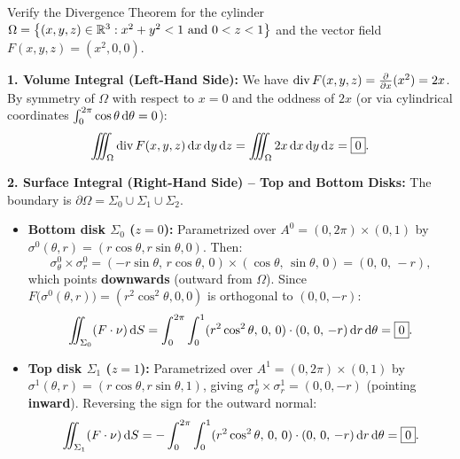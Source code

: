 \begin{exemple}
Verify the Divergence Theorem for the cylinder $\Omega = \left\{(x,y,z) \in \mathbb{R}^3 : x^2 + y^2 < 1 \text{ and } 0 < z < 1\right\}$ and the vector field $F(x,y,z) = (x^2, 0, 0)$.

\smallskip
\noindent\textbf{1. Volume Integral (Left-Hand Side):} We have $\operatorname{div} F(x,y,z) = \pdv{}{x}(x^2) = 2x$. By symmetry of $\Omega$ with respect to $x = 0$ and the oddness of $2x$ (or via cylindrical coordinates $\int_0^{2\pi} \cos\theta \,\mathrm{d}\theta = 0$):
\[
    \iiint_{\Omega} \operatorname{div} F(x,y,z) \,\mathrm{d}x\,\mathrm{d}y\,\mathrm{d}z = \iiint_{\Omega} 2x \,\mathrm{d}x\,\mathrm{d}y\,\mathrm{d}z = \boxed{0}.
\]

\noindent\textbf{2. Surface Integral (Right-Hand Side) -- Top and Bottom Disks:} The boundary is $\partial\Omega = \Sigma_0 \cup \Sigma_1 \cup \Sigma_2$.
\begin{itemize}
    \item \textbf{Bottom disk $\Sigma_0$ ($z = 0$):} Parametrized over $A^0 = (0, 2\pi) \times (0, 1)$ by $\sigma^0(\theta, r) = (r \cos\theta, r \sin\theta, 0)$. Then:
    \[
        \sigma^0_\theta \times \sigma^0_r = (-r \sin\theta, \, r \cos\theta, \, 0) \times (\cos\theta, \, \sin\theta, \, 0) = (0, \, 0, \, -r),
    \]
    which points \textbf{downwards} (outward from $\Omega$). Since $F\big(\sigma^0(\theta, r)\big) = (r^2 \cos^2\theta, 0, 0)$ is orthogonal to $(0, 0, -r)$:
    \[
        \iint_{\Sigma_0} (F \cdot \nu) \,\mathrm{d}S = \int_{0}^{2\pi} \int_{0}^{1} (r^2 \cos^2\theta, \, 0, \, 0) \cdot (0, \, 0, \, -r) \,\mathrm{d}r \,\mathrm{d}\theta = \boxed{0}.
    \]
    \item \textbf{Top disk $\Sigma_1$ ($z = 1$):} Parametrized over $A^1 = (0, 2\pi) \times (0, 1)$ by $\sigma^1(\theta, r) = (r \cos\theta, r \sin\theta, 1)$, giving $\sigma^1_\theta \times \sigma^1_r = (0, 0, -r)$ (pointing \textbf{inward}). Reversing the sign for the outward normal:
    \[
        \iint_{\Sigma_1} (F \cdot \nu) \,\mathrm{d}S = - \int_{0}^{2\pi} \int_{0}^{1} (r^2 \cos^2\theta, \, 0, \, 0) \cdot (0, \, 0, \, -r) \,\mathrm{d}r \,\mathrm{d}\theta = \boxed{0}.
    \]
\end{itemize}
\end{exemple}

